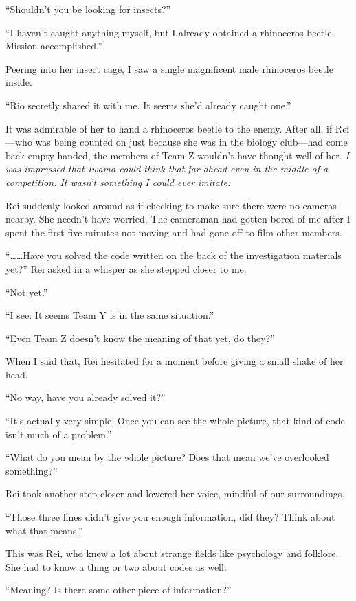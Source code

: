 \documentclass[
    a4paper,
    12pt,
    twoside,
    openany,
    UTF8,
    fontset=windows
]{ctexbook}
\begin{document}
``Shouldn't you be looking for insects?''

``I haven't caught anything myself, but I already obtained a rhinoceros beetle. Mission accomplished.''

Peering into her insect cage, I saw a single magnificent male rhinoceros beetle inside.

``Rio secretly shared it with me. It seems she'd already caught one.''

It was admirable of her to hand a rhinoceros beetle to the enemy. After all, if Rei---who was being counted on just because she was in the biology club---had come back empty-handed, the members of Team Z wouldn't have thought well of her. \textit{I was impressed that Iwama could think that far ahead even in the middle of a competition. It wasn't something I could ever imitate.}

Rei suddenly looked around as if checking to make sure there were no cameras nearby. She needn't have worried. The cameraman had gotten bored of me after I spent the first five minutes not moving and had gone off to film other members.

``\dots\dots Have you solved the code written on the back of the investigation materials yet?'' Rei asked in a whisper as she stepped closer to me.

``Not yet.''

``I see. It seems Team Y is in the same situation.''

``Even Team Z doesn't know the meaning of that yet, do they?''

When I said that, Rei hesitated for a moment before giving a small shake of her head.

``No way, have you already solved it?''

``It's actually very simple. Once you can see the whole picture, that kind of code isn't much of a problem.''

``What do you mean by the whole picture? Does that mean we've overlooked something?''

Rei took another step closer and lowered her voice, mindful of our surroundings.

``Those three lines didn't give you enough information, did they? Think about what that means.''

This was Rei, who knew a lot about strange fields like psychology and folklore. She had to know a thing or two about codes as well.

``Meaning? Is there some other piece of information?''
\end{document}

